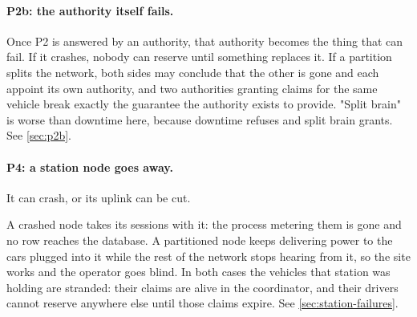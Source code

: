 \paragraph{P2b: the authority itself fails.} Once P2 is answered by an authority, that
authority becomes the thing that can fail. If it
crashes, nobody can reserve until something replaces it. If a partition splits the network,
both sides may conclude that the other is gone and each appoint its own authority, and two
authorities granting claims for the same vehicle break exactly the guarantee the authority
exists to provide. "Split brain" is worse than downtime here, because downtime refuses and
split brain grants. See \cref{sec:p2b}.

\paragraph{P4: a station node goes away.} It can crash, or its uplink can be cut.

A crashed node takes its sessions with it: the process metering them is gone and no row
reaches the database. A partitioned node keeps delivering power to the cars plugged into it
while the rest of the network stops hearing from it, so the site works and the operator goes
blind. In both cases the vehicles that station was holding are stranded: their claims are
alive in the coordinator, and their drivers cannot reserve anywhere else until those claims
expire. See \cref{sec:station-failures}.
